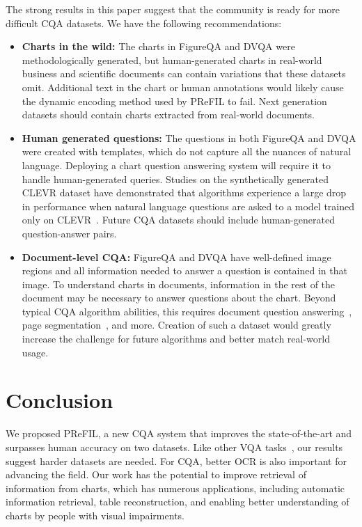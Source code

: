 \documentclass[10pt,twocolumn]{article}
\begin{document}
The strong results in this paper suggest that the community is ready for more difficult CQA datasets. We have the following recommendations:
\begin{itemize}[noitemsep,nolistsep]
    \item \textbf{Charts in the wild:} The charts in FigureQA and DVQA were methodologically generated, but human-generated charts in real-world business and scientific documents can contain variations that these datasets omit. Additional text in the chart or human annotations would likely cause the dynamic encoding method used by PReFIL to fail. Next generation datasets should contain charts extracted from real-world documents.

    \item \textbf{Human generated questions:} The questions in both FigureQA and DVQA were created with templates, which do not capture all the nuances of natural language. Deploying a chart question answering system will require it to handle human-generated queries. Studies on the synthetically generated CLEVR dataset have demonstrated that algorithms experience a large drop in performance when natural language questions are asked to a model trained only on CLEVR~\cite{clevr-iep}.  Future CQA datasets should include human-generated question-answer pairs. 
    
    \item \textbf{Document-level CQA:} FigureQA and DVQA have well-defined image regions and all information needed to answer a question is contained in that image. To understand charts in documents, information in the rest of the document may be necessary to answer questions about the chart. Beyond typical CQA algorithm abilities, this requires document question answering~\cite{Clark2018SimpleAE}, page segmentation~\cite{he2017multi}, and more. Creation of such a dataset would greatly increase the challenge for future algorithms and better match real-world usage. 
\end{itemize}

\section{Conclusion}
We proposed PReFIL, a new CQA system that improves the state-of-the-art and surpasses human accuracy on two datasets. Like other VQA tasks~\cite{kafle2019challenges}, our results suggest  harder datasets are needed. For CQA, better OCR is also important for advancing the field. Our work has the potential to improve retrieval of information from charts, which has numerous applications, including automatic information retrieval, table reconstruction, and enabling better understanding of charts by people with visual impairments.
\vspace{-3px}
\end{document}
